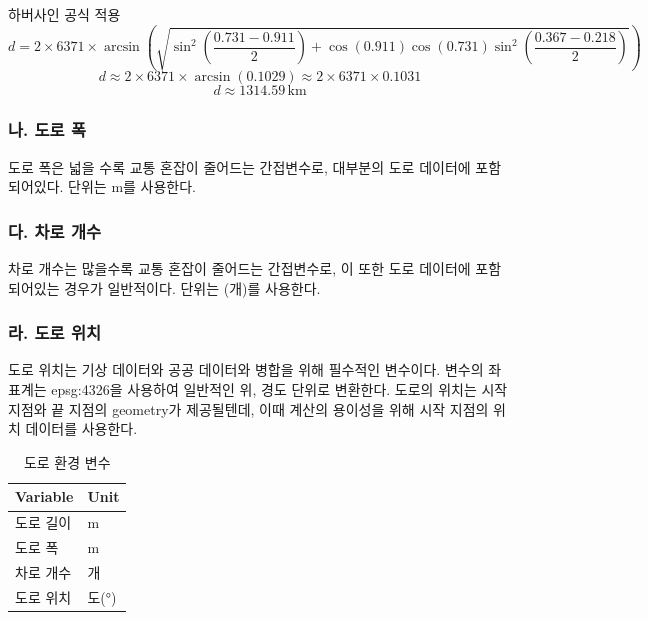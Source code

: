 \documentclass[11pt]{report}
\begin{document}
하버사인 공식 적용
$$
d = 2 \times 6371 \times \arcsin\left( \sqrt{\sin^2\left(\frac{0.731 - 0.911}{2}\right) + \cos(0.911) \cos(0.731) \sin^2\left(\frac{0.367 - 0.218}{2}\right)} \right)
$$
$$
d \approx 2 \times 6371 \times \arcsin(0.1029) \approx 2 \times 6371 \times 0.1031
$$
$$
d \approx 1314.59 \, \text{km}
$$

\subsubsection*{나. 도로 폭}
도로 폭은 넓을 수록 교통 혼잡이 줄어드는 간접변수로, 대부분의 도로 데이터에 포함되어있다. 
단위는 m를 사용한다. 

\subsubsection*{다. 차로 개수}
차로 개수는 많을수록 교통 혼잡이 줄어드는 간접변수로, 이 또한 도로 데이터에 포함되어있는 경우가 일반적이다. 
단위는 (개)를 사용한다.

\subsubsection*{라. 도로 위치}
도로 위치는 기상 데이터와 공공 데이터와 병합을 위해 필수적인 변수이다. 
변수의 좌표계는 epsg:4326을 사용하여 일반적인 위, 경도 단위로 변환한다. 
도로의 위치는 시작 지점와 끝 지점의 geometry가 제공될텐데, 이때 계산의 용이성을 위해 시작 지점의 위치 데이터를 사용한다. 

\begin{table}[H]
	\begin{center}
	\vspace{0.5cm}
	\begin{tabular}{|l|l|}
	\hline
	\rowcolor[HTML]{C0C0C0} 
	Variable & Unit \\ \hline
	도로 길이    & m    \\ \hline
	도로 폭     & m    \\ \hline
	차로 개수    & 개    \\ \hline
	도로 위치    & 도(°) \\ \hline
	\end{tabular}
	\end{center}
	\caption{도로 환경 변수}
	\label{tab:road_var}
\end{table}
\end{document}
